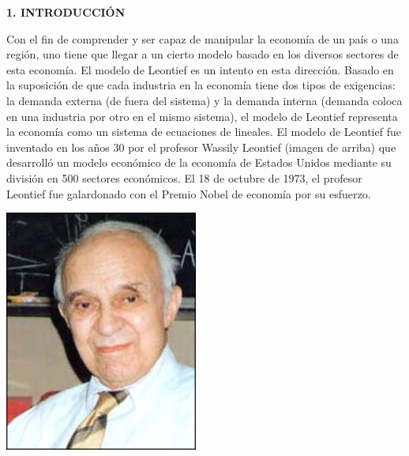 \documentclass[10pt,a4paper]{article}
\begin{document}
\pagebreak

\begin{multicols}{2}
\begin{center}
{\large \bf 1. INTRODUCCI\'ON}
\end{center}
 Con el fin de comprender y ser capaz de manipular la economía de un país o una región, uno tiene que llegar a un cierto modelo basado en los diversos sectores de esta economía. El modelo de Leontief es un intento en esta dirección. Basado en la suposición de que cada industria en la economía tiene dos tipos de exigencias: la demanda externa (de fuera del sistema) y la demanda interna (demanda coloca en una industria por otro en el mismo sistema), el modelo de Leontief representa la economía como un sistema de ecuaciones de lineales. El modelo de Leontief fue inventado en los años 30 por el profesor Wassily Leontief (imagen de arriba) que desarrolló un modelo económico de la economía de Estados Unidos mediante su división en 500 sectores económicos. El 18 de octubre de 1973, el profesor Leontief fue galardonado con el Premio Nobel de economía por su esfuerzo.
\\
\begin{center}
	\includegraphics[scale=0.7]{leontief}
\end{center}

\vspace*{0.5cm}


\end{multicols}
\end{document}
